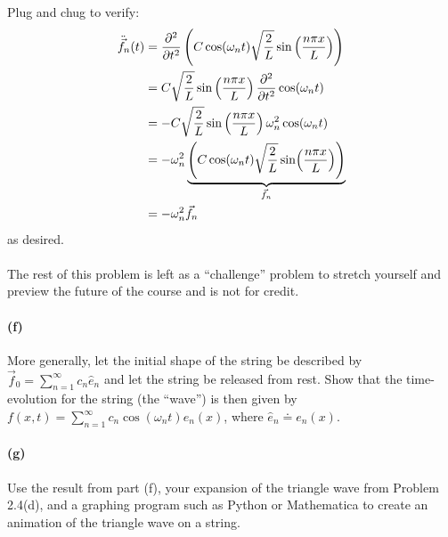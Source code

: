 \documentclass{article}
\begin{document}
\begin{solution}
	Plug and chug to verify:
	\begin{align*}
		\ddot{\vec f}_n(t) &= \pdv[2]{t}\left( C \cos(\omega_nt) \sqrt{\frac{2}{L}}  \sin\left( \frac{n \pi x}{L}\right)\right)\\
					   &= C\sqrt{\frac{2}{L}}  \sin\left(\frac{n \pi x}{L}\right) \pdv[2]{t}\cos(\omega_nt) \\
						   &= -C\sqrt{\frac{2}{L}} \sin\left(\frac{n \pi x}{L}\right) \omega_n^2 \cos(\omega_n t) \\
						   &= -\omega_n^2 \underbrace{\left(C \cos(\omega_n t)
						   \sqrt{\frac{2}{L}}  \sin(\frac{n \pi x}{L})\right)}_{\vec f_n} \\
						   &= -\omega_n^2 \vec f_n 
	\end{align*} 
	as desired. 
\end{solution}

\phline
\paragraph{}
The rest of this problem is left as a ``challenge'' problem to stretch yourself and preview the future of the course and is not for credit.

\paragraph{(f)}		\extrapart
More generally, let the initial shape of the string be described by $\vec{f}_{0} = \sum_{n=1}^{\infty} c_{n}\hat{e}_{n}$ and let the string be released from rest.
Show that the time-evolution for the string (the ``wave'') is then given by $f(x,t) = \sum_{n=1}^{\infty} c_{n}\cos(\omega_{n}t){e}_{n}(x)$,
where $\hat{e}_{n}\doteq e_{n}(x)$.

\paragraph{(g)}		\extrapart
Use the result from part (f), your expansion of the triangle wave from Problem 2.4(d), and a graphing program such as Python or Mathematica to create an animation of the 
triangle wave on a string.\\


\endofhomework
\addfooter
\end{document}
